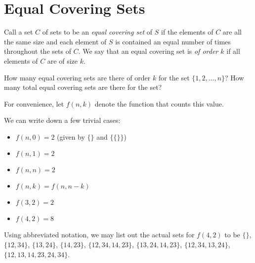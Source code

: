 \documentclass[a4paper, 12pt]{article}
\begin{document}
\section*{Equal Covering Sets}

\begin{definition}
    Call a set \( C \) of sets to be an \textit{equal covering set} of \( S \) if the elements of \( C \) are all the same size and each element of \( S \) is contained an equal number of times throughout the sets of \( C \). We say that an equal covering set is \textit{of order \( k \)} if all elements of \( C \) are of size \( k \).
\end{definition}

\begin{chirpbox}
    \begin{problem}
        How many equal covering sets are there of order \( k \) for the set \( \{1, 2, \ldots, n \} \)? How many total equal covering sets are there for the set?
    \end{problem}
\end{chirpbox}

For convenience, let \( f(n, k) \) denote the function that counts this value.

\begin{example}
    We can write down a few trivial cases:
    \begin{multicols}{2}
    \begin{itemize}
        \item \( f(n, 0) = 2 \) (given by \( \{ \} \) and \( \{ \{ \} \} \))
        \item \( f(n, 1) = 2 \)
        \item \( f(n, n) = 2 \)
        \item \( f(n, k) = f(n, n-k) \)
        \item \( f(3, 2) = 2 \)
        \item \( f(4, 2) = 8 \)
    \end{itemize}
    \end{multicols}
    Using abbreviated notation, we may list out the actual sets for \( f(4, 2) \) to be \( \{ \} \), \( \{ 12, 34 \} \), \( \{ 13, 24 \} \), \( \{ 14, 23 \} \), \( \{ 12, 34, 14, 23 \} \), \( \{ 13, 24, 14, 23 \} \), \( \{ 12, 34, 13, 24 \} \), \( \{ 12, 13, 14, 23, 24, 34 \} \).
\end{example}
\end{document}
